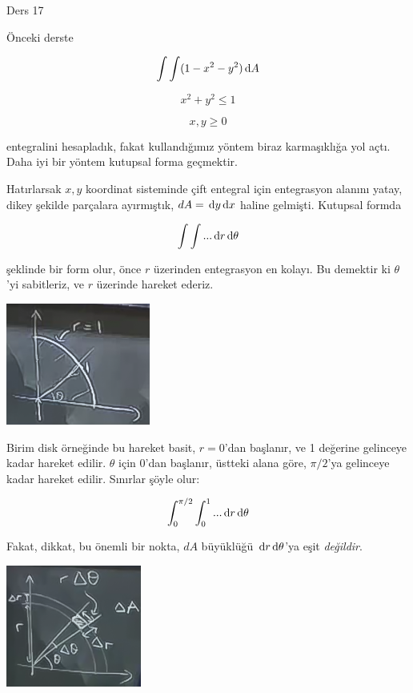 \documentclass[12pt,fleqn]{article}\usepackage{../../common}
\begin{document}
Ders 17

Önceki derste 

$$ \int \int (1-x^2-y^2) \,\mathrm{d} A $$

$$ x^2+y^2 \le 1 $$

$$ x,y \ge 0 $$

entegralini hesapladık, fakat kullandığımız yöntem biraz karmaşıklığa yol
açtı. Daha iyi bir yöntem kutupsal forma geçmektir. 

Hatırlarsak $x,y$ koordinat sisteminde çift entegral için entegrasyon alanını
yatay, dikey şekilde parçalara ayırmıştık, $dA = \,\mathrm{d} y \,\mathrm{d} x$ haline
gelmişti. Kutupsal formda

$$ \int \int  ... \,\mathrm{d} r \,\mathrm{d} \theta$$

şeklinde bir form olur, önce $r$ üzerinden entegrasyon en kolayı. Bu
demektir ki $\theta$'yi sabitleriz, ve $r$ üzerinde hareket ederiz. 

\begin{center}
\includegraphics[height=4cm]{17_1.png}
\end{center}

Birim disk örneğinde bu hareket basit, $r=0$'dan başlanır, ve 1 değerine
gelinceye kadar hareket edilir. $\theta$ için 0'dan başlanır, üstteki alana
göre, $\pi/2$'ya gelinceye kadar hareket edilir. Sınırlar şöyle olur:

$$ \int_0^{\pi/2} \int_0^1  ... \,\mathrm{d} r \,\mathrm{d} \theta$$

Fakat, dikkat, bu önemli bir nokta, $dA$ büyüklüğü $\,\mathrm{d} r \,\mathrm{d} \theta$'ya eşit
{\em değildir}.

\begin{center}
\includegraphics[height=4cm]{17_2.png}
\end{center}
\end{document}
